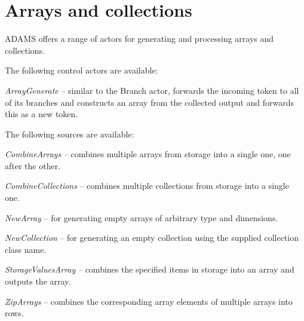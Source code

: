 \newpage
\section{Arrays and collections}
\label{arrays_and_collections}
ADAMS offers a range of actors for generating and processing arrays and
collections.

\noindent The following control actors are available:
\begin{tight_itemize}
	\item \textit{ArrayGenerate} -- similar to the Branch actor, forwards
	the incoming token to all of its branches and constructs an array from
	the collected output and forwards this as a new token.
\end{tight_itemize}

\noindent The following sources are available:
\begin{tight_itemize}
	\item \textit{CombineArrays} -- combines multiple arrays from storage into a single one, one after the other.
	\item \textit{CombineCollections} -- combines multiple collections from storage into a single one.
	\item \textit{NewArray} -- for generating empty arrays of arbitrary type
	and dimensions.
	\item \textit{NewCollection} -- for generating an empty collection using
	the supplied collection class name.
	\item \textit{StorageValuesArray} -- combines the specified items in
	storage into an array and outputs the array.
	\item \textit{ZipArrays} -- combines the corresponding array elements of multiple arrays into rows.
\end{tight_itemize}


